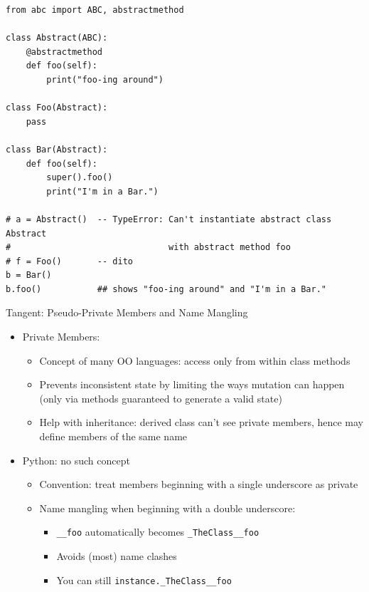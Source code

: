 
\begin{frame}[fragile]
%
\begin{codebox}
\begin{verbatim}
from abc import ABC, abstractmethod

class Abstract(ABC):
    @abstractmethod
    def foo(self):
        print("foo-ing around")

class Foo(Abstract):
    pass

class Bar(Abstract):
    def foo(self):
        super().foo()
        print("I'm in a Bar.")

# a = Abstract()  -- TypeError: Can't instantiate abstract class Abstract 
#                               with abstract method foo
# f = Foo()       -- dito
b = Bar()
b.foo()           ## shows "foo-ing around" and "I'm in a Bar."
\end{verbatim}
\end{codebox}
%
\end{frame}


\begin{frame}[fragile]{Tangent: Pseudo-Private Members and Name Mangling}
%
\begin{itemize}
\item Private Members:
	\begin{itemize}
	\item Concept of many OO languages: access only from within class methods
	\item Prevents inconsistent state by limiting the ways mutation can happen (\thus only via methods guaranteed to generate a valid state)
	\item Help with inheritance: derived class can't see private members, hence may define members of the same name
	\end{itemize}
\item Python: no such concept
	\begin{itemize}
	\item Convention: treat members beginning with a single underscore as private
	\item Name mangling when beginning with a double underscore:
		\begin{itemize}
		\item \texttt{\_\_foo} automatically becomes \texttt{\_TheClass\_\_foo}
		\item Avoids (most) name clashes
		\item You can still \texttt{instance.\_TheClass\_\_foo}
		\end{itemize}
	\end{itemize}
\end{itemize}
%
\end{frame}

